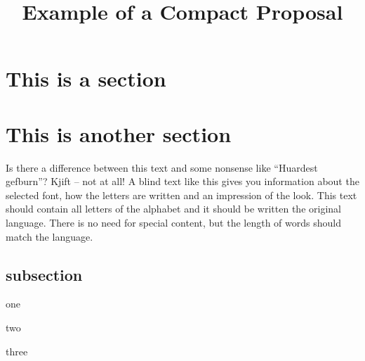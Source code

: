 \documentclass[draft, nonotes]{compactproposal}
\title{Example of a Compact Proposal}
\begin{document}
 
\maketitle

\section{This is a section}

\blindtext[4]

\section{This is another section}



Is there a difference between this text and some nonsense like “Huardest gefburn”? Kjift – not at all! 
A blind text like this gives you information about the selected font, how the letters are written and an impression of the look.
This text should contain all letters of the alphabet and it should be written  the original language. 
There is no need for special content, but the length of words should match the language. 
\subsection{subsection}
\begin{tightitemize}
	\item one
	\item two
	\item three
\end{tightitemize}

\blindtext[4]
\end{document}
